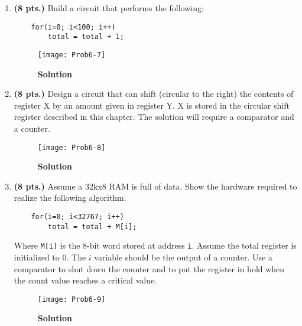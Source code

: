 \begin{enumerate}
    \item\textbf{ (8 pts.)} Build a circuit that performs the following:
\begin{verbatim}
    for(i=0; i<100; i++)
        total = total + 1;
\end{verbatim}

        \begin{onlysolution} \itshape{
                \begin{figure}[ht]
                    \caption{\textbf{Solution}}
                    \texttt{[image: Prob6-7]}
                \end{figure}
            }
        \end{onlysolution}

        \ifshowanswers\needspace{2in}\fi
    \item\textbf{ (8 pts.)} Design a circuit that can shift (circular
        to the right) the contents of register X by an amount given in
        register Y. X is stored in the circular shift register described
        in this chapter. The solution will require a comparator and a
        counter.
        \begin{onlysolution}\needspace{2in} \itshape{
                \begin{figure}[ht]
                    \caption{\textbf{Solution}}
                    \texttt{[image: Prob6-8]}
                \end{figure}
            }
        \end{onlysolution}

        \ifshowanswers\needspace{2in}\fi
    \item\textbf{ (8 pts.)} Assume a 32kx8 RAM is full of data. Show
        the hardware required to realize the following algorithm.
\begin{verbatim}
    for(i=0; i<32767; i++)
        total = total + M[i];
\end{verbatim}

        Where \verb+M[i]+ is the 8-bit word stored at address \verb^i^.
        Assume the total register is initialized to 0. The $i$ variable should
        be the output of a counter. Use a comparator to shut down the counter
        and to put the register in hold when the count value reaches a critical
        value.
        \begin{onlysolution} \itshape{
                \begin{figure}[ht]
                    \caption{\textbf{Solution}}
                    \texttt{[image: Prob6-9]}
                \end{figure}
            }


\end{onlysolution}
\end{enumerate}
